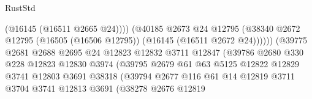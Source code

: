 \begin{lexlean}{RustStd}
\begin{coremodule}
                                              (@16145 (@16511 @2665 @24))))
                                          (@40185
                                            @2673
                                            @24
                                            @12795
                                            (@38340
                                              @2672
                                              @12795
                                              (@16505 (@16506 @12795))
                                              (@16145 (@16511 @2672 @24))))))
                                      (@39775
                                        @2681
                                        @2688
                                        @2695
                                        @24
                                        @12823
                                        @12832
                                        @3711
                                        @12847
                                        (@39786
                                          @2680
                                          @330
                                          @228
                                          @12823
                                          @12830
                                          @3974
                                          (@39795
                                            @2679
                                            @61
                                            @63
                                            @5125
                                            @12822
                                            @12829
                                            @3741
                                            @12803
                                            @3691
                                            @38318
                                            (@39794
                                              @2677
                                              @116
                                              @61
                                              @14
                                              @12819
                                              @3711
                                              @3704
                                              @3741
                                              @12813
                                              @3691
                                              (@38278
                                                @2676
                                                @12819

\end{coremodule}
\end{lexlean}
